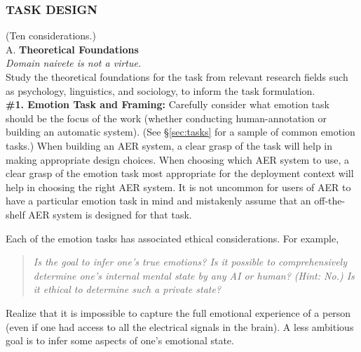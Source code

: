 \documentclass{clv3}
\begin{document}
\subsubsection{TASK DESIGN} (Ten considerations.) \\[10pt]
\label{sec:taskdesign}
%
\noindent A. \textbf{Theoretical Foundations}\\[2pt]
\textit{Domain naivete is not a virtue.}\\[5pt]
Study the theoretical foundations for the task from relevant research fields such as psychology, linguistics, and sociology, to inform the  task formulation.\\[10pt]
\noindent \textbf{\#1. Emotion Task and Framing:} Carefully consider what emotion task should be the focus of the work (whether conducting human-annotation or building an automatic system). 
(See \S\ref{sec:tasks} for a sample of common emotion tasks.)
When building an AER system, a clear grasp of the task will help in making appropriate design choices. 
When choosing which AER system to use, a clear grasp of the emotion task most appropriate for the deployment context will help in choosing the right AER system.
It is not uncommon for users of AER to have a particular emotion task in mind and mistakenly assume that an off-the-shelf AER system is designed for that task.

Each of the emotion tasks has associated ethical considerations. For example,\\[-20pt]
\begin{quote}
\textit{Is the goal to infer one’s true emotions? Is it possible to comprehensively determine one’s internal mental state by any AI or human? (Hint: No.)
Is it ethical to determine such a private state?}
\end{quote}
\vspace*{-2mm}
\noindent Realize that it is impossible to capture the full emotional experience of a person (even if one had access to all the electrical signals in the brain).
A less ambitious goal is to infer some aspects of one’s emotional state.
\end{document}
